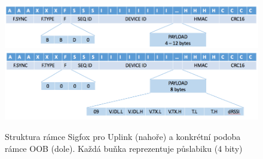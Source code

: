 \documentclass{ctuthesis}
\begin{document}
\begin{figure}
\caption{Struktura rámce Sigfox pro Uplink (nahoře) a konkrétní podoba rámce OOB (dole). Každá buňka reprezentuje půslabiku (4 bity) \cite{sigfoxprotocol}}
\includegraphics[width=1\textwidth]{./images/SigfoxFrameRx.png}
\includegraphics[width=1\textwidth]{./images/SigfoxFrameOobRx.png}
\label{sigfoxRxRamce}
\end{figure}
\end{document}
